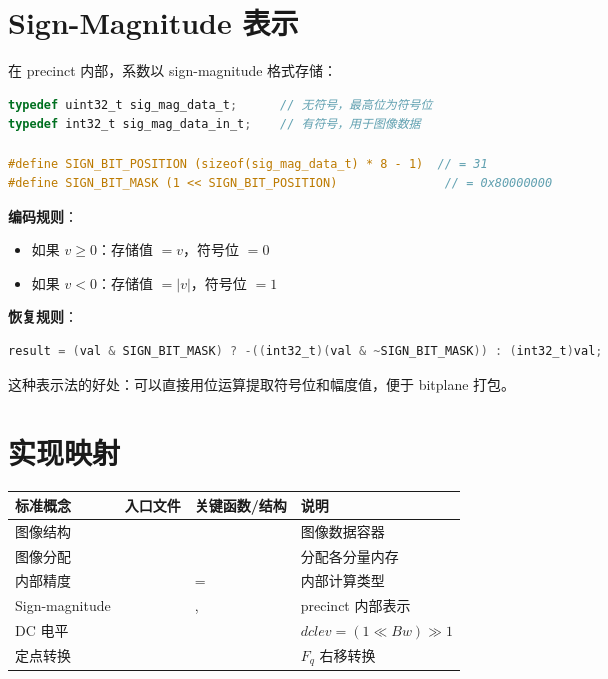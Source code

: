 \section{Sign-Magnitude 表示}

在 precinct 内部，系数以 sign-magnitude 格式存储：

\begin{lstlisting}[language=C]
typedef uint32_t sig_mag_data_t;      // 无符号，最高位为符号位
typedef int32_t sig_mag_data_in_t;    // 有符号，用于图像数据

#define SIGN_BIT_POSITION (sizeof(sig_mag_data_t) * 8 - 1)  // = 31
#define SIGN_BIT_MASK (1 << SIGN_BIT_POSITION)               // = 0x80000000
\end{lstlisting}

\textbf{编码规则}：
\begin{itemize}
  \item 如果 $v \geq 0$：存储值 $= v$，符号位 $= 0$
  \item 如果 $v < 0$：存储值 $= |v|$，符号位 $= 1$
\end{itemize}

\textbf{恢复规则}：
\begin{lstlisting}[language=C,numbers=none]
result = (val & SIGN_BIT_MASK) ? -((int32_t)(val & ~SIGN_BIT_MASK)) : (int32_t)val;
\end{lstlisting}

这种表示法的好处：可以直接用位运算提取符号位和幅度值，便于 bitplane 打包。

\section{实现映射}

\begin{implmap}
\begin{tabular}{@{}L{2.5cm}L{3.5cm}L{4.8cm}L{4.5cm}@{}}
\toprule
标准概念 & 入口文件 & 关键函数/结构 & 说明 \\
\midrule
图像结构 &  &  & 图像数据容器 \\
图像分配 &  &  & 分配各分量内存 \\
内部精度 &  &  =  & 内部计算类型 \\
Sign-magnitude &  & ,  & precinct 内部表示 \\
DC 电平 &  &  & $\mathit{dclev} = (1 \ll Bw) \gg 1$ \\
定点转换 &  &  & $F_q$ 右移转换 \\
\bottomrule
\end{tabular}
\end{implmap}

